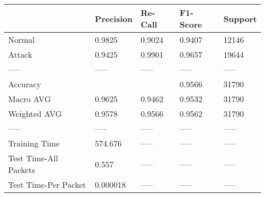 \begin{tabular}{lllll}
\toprule
{} & Precision & Re-Call & F1-Score & Support \\
\midrule
Normal                &    0.9825 &  0.9024 &   0.9407 &   12146 \\
Attack                &    0.9425 &  0.9901 &   0.9657 &   19644 \\
-----                 &     ----- &   ----- &    ----- &   ----- \\
Accuracy              &           &         &   0.9566 &   31790 \\
Macro AVG             &    0.9625 &  0.9462 &   0.9532 &   31790 \\
Weighted AVG          &    0.9578 &  0.9566 &   0.9562 &   31790 \\
-----                 &     ----- &   ----- &    ----- &   ----- \\
Training Time         &   574.676 &   ----- &    ----- &   ----- \\
Test Time-All Packets &     0.557 &   ----- &    ----- &   ----- \\
Test Time-Per Packet  &  0.000018 &   ----- &    ----- &   ----- \\
\bottomrule
\end{tabular}
